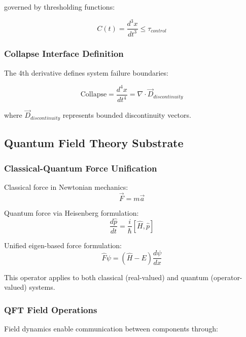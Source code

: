 \documentclass[12pt]{article}
\begin{document}
governed by thresholding functions:

\begin{equation}
C(t) = \frac{d^3x}{dt^3} \leq \tau_{control}
\end{equation}

\subsubsection{Collapse Interface Definition}

The 4th derivative defines system failure boundaries:

\begin{equation}
\text{Collapse} = \frac{d^4x}{dt^4} = \nabla \cdot \vec{D}_{discontinuity}
\end{equation}

where $\vec{D}_{discontinuity}$ represents bounded discontinuity vectors.

\subsection{Quantum Field Theory Substrate}

\subsubsection{Classical-Quantum Force Unification}

Classical force in Newtonian mechanics:
\begin{equation}
\vec{F} = m\vec{a}
\end{equation}

Quantum force via Heisenberg formulation:
\begin{equation}
\frac{d\hat{p}}{dt} = \frac{i}{\hbar}[\hat{H}, \hat{p}]
\end{equation}

Unified eigen-based force formulation:
\begin{equation}
\hat{F}\psi = (\hat{H} - E)\frac{d\psi}{dx}
\end{equation}

This operator applies to both classical (real-valued) and quantum (operator-valued) systems.

\subsubsection{QFT Field Operations}

Field dynamics enable communication between components through:
\end{document}
